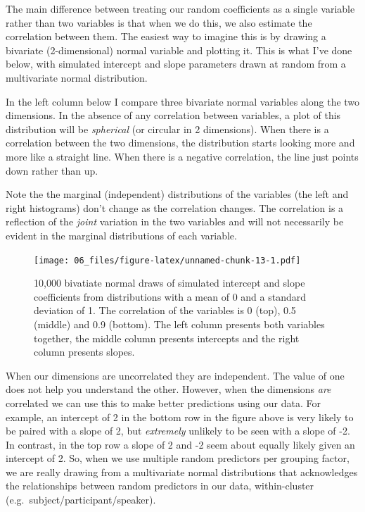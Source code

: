 \documentclass[
]{book}
\begin{document}
The main difference between treating our random coefficients as a single variable rather than two variables is that when we do this, we also estimate the correlation between them. The easiest way to imagine this is by drawing a bivariate (2-dimensional) normal variable and plotting it. This is what I've done below, with simulated intercept and slope parameters drawn at random from a multivariate normal distribution.

In the left column below I compare three bivariate normal variables along the two dimensions. In the absence of any correlation between variables, a plot of this distribution will be \emph{spherical} (or circular in 2 dimensions). When there is a correlation between the two dimensions, the distribution starts looking more and more like a straight line. When there is a negative correlation, the line just points down rather than up.

Note the the marginal (independent) distributions of the variables (the left and right histograms) don't change as the correlation changes. The correlation is a reflection of the \emph{joint} variation in the two variables and will not necessarily be evident in the marginal distributions of each variable.

\begin{figure}
\centering
\texttt{[image: 06\_files/figure-latex/unnamed-chunk-13-1.pdf]}
\caption{\label{fig:unnamed-chunk-13}10,000 bivatiate normal draws of simulated intercept and slope coefficients from distributions with a mean of 0 and a standard deviation of 1. The correlation of the variables is 0 (top), 0.5 (middle) and 0.9 (bottom). The left column presents both variables together, the middle column presents intercepts and the right column presents slopes.}
\end{figure}

When our dimensions are uncorrelated they are independent. The value of one does not help you understand the other. However, when the dimensions \emph{are} correlated we can use this to make better predictions using our data. For example, an intercept of 2 in the bottom row in the figure above is very likely to be paired with a slope of 2, but \emph{extremely} unlikely to be seen with a slope of -2. In contrast, in the top row a slope of 2 and -2 seem about equally likely given an intercept of 2. So, when we use multiple random predictors per grouping factor, we are really drawing from a multivariate normal distributions that acknowledges the relationships between random predictors in our data, within-cluster (e.g.~subject/participant/speaker).
\end{document}
